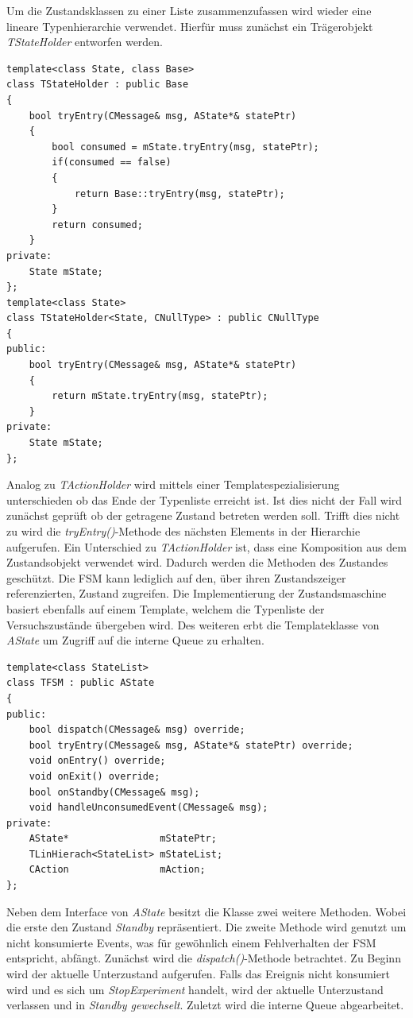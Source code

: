 Um die Zustandsklassen zu einer Liste zusammenzufassen wird wieder eine lineare Typenhierarchie verwendet. Hierfür muss zunächst ein Trägerobjekt \textit{TStateHolder} entworfen werden. 
\begin{lstlisting}[caption={Implementierung der Trägerklasse für Zustände},captionpos=b]
template<class State, class Base>
class TStateHolder : public Base
{
	bool tryEntry(CMessage& msg, AState*& statePtr)
	{
		bool consumed = mState.tryEntry(msg, statePtr);
		if(consumed == false)
		{
			return Base::tryEntry(msg, statePtr);
		}
		return consumed;
	}
private:
	State mState;
};
template<class State>
class TStateHolder<State, CNullType> : public CNullType
{
public:
	bool tryEntry(CMessage& msg, AState*& statePtr)
	{
		return mState.tryEntry(msg, statePtr);
	}
private:
	State mState;
};
\end{lstlisting}
Analog zu \textit{TActionHolder} wird mittels einer Templatespezialisierung unterschieden ob das Ende der Typenliste erreicht ist. Ist dies nicht der Fall wird zunächst geprüft ob der getragene Zustand betreten werden soll. Trifft dies nicht zu wird  die \textit{tryEntry()}-Methode des nächsten Elements in der Hierarchie aufgerufen. Ein Unterschied zu \textit{TActionHolder} ist, dass eine Komposition aus dem Zustandsobjekt verwendet wird. Dadurch werden die Methoden des Zustandes geschützt. Die FSM kann lediglich auf den, über ihren Zustandszeiger referenzierten, Zustand zugreifen.
Die Implementierung der Zustandsmaschine basiert ebenfalls auf einem Template, welchem die Typenliste der Versuchszustände übergeben wird. Des weiteren erbt die Templateklasse von \textit{AState} um Zugriff auf die interne Queue zu erhalten.
\begin{lstlisting}[caption={Implementierung der Templateklasse für die Zustandsmaschine},captionpos=b]
template<class StateList>
class TFSM : public AState
{
public:
	bool dispatch(CMessage& msg) override;
	bool tryEntry(CMessage& msg, AState*& statePtr) override;
	void onEntry() override;
	void onExit() override;
	bool onStandby(CMessage& msg);
	void handleUnconsumedEvent(CMessage& msg);
private:
	AState*                mStatePtr;
	TLinHierach<StateList> mStateList;
	CAction                mAction;
};
\end{lstlisting}
Neben dem Interface von \textit{AState} besitzt die Klasse zwei weitere Methoden. Wobei die erste den Zustand \textit{Standby} repräsentiert. Die zweite Methode wird genutzt um nicht konsumierte Events, was für gewöhnlich einem Fehlverhalten der FSM entspricht, abfängt. Zunächst wird die \textit{dispatch()}-Methode betrachtet. Zu Beginn wird der aktuelle Unterzustand aufgerufen. Falls das Ereignis nicht konsumiert wird und es sich um \textit{StopExperiment} handelt, wird der aktuelle Unterzustand verlassen und in \textit{Standby gewechselt}. Zuletzt wird die interne Queue abgearbeitet.
